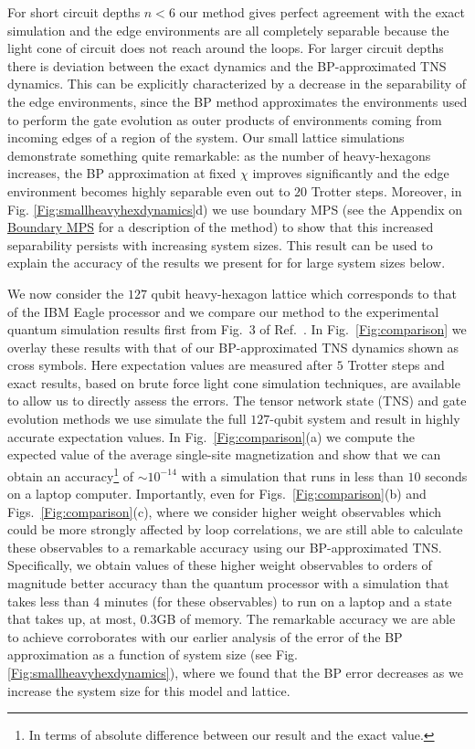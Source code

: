\documentclass[%
 superscriptaddress,
 amsmath,amssymb,
 prx, nofootinbib,
]{revtex4-2}
\begin{document}
For short circuit depths $n < 6$ our method gives perfect agreement with the exact simulation and the edge environments are all completely separable because the light cone of circuit does not reach around the loops. For larger circuit depths there is deviation between the exact dynamics and the  BP-approximated TNS dynamics. This can be explicitly characterized by a decrease in the separability of the edge environments, since the BP method approximates the environments used to perform the gate evolution as outer products of environments coming from incoming edges of a region of the system. Our small lattice simulations demonstrate something quite remarkable: as the number of heavy-hexagons increases, the BP approximation at fixed $\chi$ improves significantly and the edge environment becomes highly separable even out to $20$ Trotter steps. Moreover, in Fig. \ref{Fig:smallheavyhexdynamics}d) we use boundary MPS (see the Appendix on \hyperref[Subsec:BoundaryMPS]{Boundary MPS} for a description of the method) to show that this increased separability persists with increasing system sizes. This result can be used to explain the accuracy of the results we present for for large system sizes below. 

We now consider the $127$ qubit heavy-hexagon lattice which corresponds to that of the IBM Eagle processor and we compare our method to the experimental quantum simulation results first from Fig.~3 of Ref.~\cite{kim2023}. In Fig.~\ref{Fig:comparison} we overlay these results with that
of our BP-approximated TNS dynamics shown as cross symbols.
Here expectation values are measured after $5$ Trotter steps and exact results, based on brute force light cone simulation techniques, are available to allow us to directly assess the errors. 
The tensor network state (TNS) and gate evolution methods we use simulate the full $127$-qubit system and result in highly accurate expectation values. In Fig.~\ref{Fig:comparison}(a) we compute the expected value of the average single-site magnetization and show that we can obtain an accuracy\footnote{In terms of absolute difference between our result and the exact value.} of $\sim 10^{-14}$ with a simulation that runs in less than $10$ seconds on a laptop computer. 
Importantly, even for Figs.~\ref{Fig:comparison}(b) and Figs.~\ref{Fig:comparison}(c), where we consider higher weight observables which could be more strongly affected by loop correlations, we are still able to calculate these observables to a remarkable accuracy using our BP-approximated TNS. Specifically,
we obtain values of these higher weight observables to orders of magnitude better accuracy than the quantum processor with a simulation that takes less than $4$ minutes (for these observables) to run on a laptop and a state that takes up, at most, $0.3$GB of memory.
The remarkable accuracy we are able to achieve corroborates with our earlier analysis of the error of the BP approximation as a function of system size (see Fig. \ref{Fig:smallheavyhexdynamics}), where we found that the BP error decreases as we increase the system size for this model and lattice.
\end{document}
